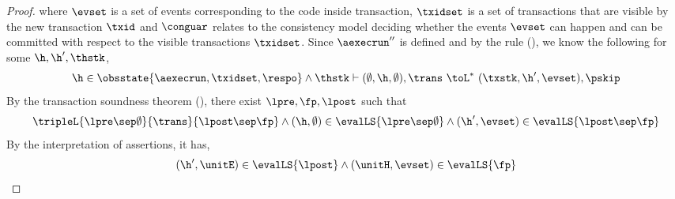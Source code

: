 \begin{proof}
where \( \evset \) is a set of events corresponding to the code inside transaction, \( \txidset \) is  a set of transactions that are visible by the new transaction \( \txid \) and \( \conguar \) relates to the consistency model deciding whether the events \( \evset \) can happen and can be committed with respect to the visible transactions \( \txidset \).
Since \( \aexecrun'' \) is defined and by the  rule (), we know the following for some \( \h, \h', \thstk \),
\begin{equation}
    \label{equ:local-transfer}
    \h \in \obsstate{\aexecrun, \txidset, \respo}
    \land \thstk \vdash (\emptyset, \h, \emptyset) , \trans \ \toL^{*} \  (\txstk, \h', \evset) , \pskip 
\end{equation}
By the transaction soundness theorem (), there exist \( \lpre, \fp, \lpost \) such that
\[ 
\tripleL{\lpre \sep \emptyset}{\trans}{\lpost \sep \fp} \land (\h, \emptyset) \in \evalLS{\lpre \sep \emptyset} \land (\h', \evset) \in \evalLS{\lpost \sep \fp}
\]
By the interpretation of assertions, it has,
\begin{equation}
(\h', \unitE) \in \evalLS{\lpost} \land (\unitH, \evset) \in \evalLS{\fp}
\end{equation}
\end{proof}

